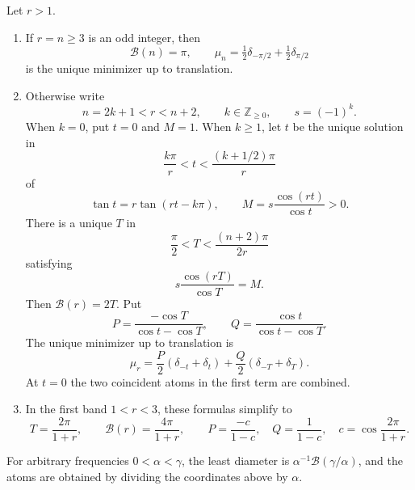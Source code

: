 \begin{theorem}\label{filt:classification}
Let $r>1$.
\begin{enumerate}
\item If $r=n\ge3$ is an odd integer, then
\[
 \mathcal B(n)=\pi,
 \qquad \mu_n=\tfrac12\delta_{-\pi/2}+\tfrac12\delta_{\pi/2}
\]
is the unique minimizer up to translation.
\item Otherwise write
\[
 n=2k+1<r<n+2,\qquad k\in\mathbb Z_{\ge0},\qquad s=(-1)^k.
\]
When $k=0$, put $t=0$ and $M=1$.  When $k\ge1$, let $t$ be the unique
solution in
\[
 \frac{k\pi}{r}<t<\frac{(k+1/2)\pi}{r}
\]
of
\begin{equation}\label{filt:tangent}
 \tan t=r\tan(rt-k\pi),
 \qquad M=s\frac{\cos(rt)}{\cos t}>0.
\end{equation}
There is a unique $T$ in
\[
 \frac\pi2<T<\frac{(n+2)\pi}{2r}
\]
satisfying
\begin{equation}\label{filt:crossing}
 s\frac{\cos(rT)}{\cos T}=M.
\end{equation}
Then $\mathcal B(r)=2T$.  Put
\[
 P=\frac{-\cos T}{\cos t-\cos T},\qquad
 Q=\frac{\cos t}{\cos t-\cos T}.
\]
The unique minimizer up to translation is
\begin{equation}\label{filt:measure}
 \mu_r=\frac P2(\delta_{-t}+\delta_t)
             +\frac Q2(\delta_{-T}+\delta_T).
\end{equation}
At $t=0$ the two coincident atoms in the first term are combined.
\item In the first band $1<r<3$, these formulas simplify to
\begin{equation}\label{filt:firstband}
 T=\frac{2\pi}{1+r},\qquad
 \mathcal B(r)=\frac{4\pi}{1+r},\qquad
 P=\frac{-c}{1-c},\quad Q=\frac1{1-c},\quad
 c=\cos\frac{2\pi}{1+r}.
\end{equation}
\end{enumerate}
For arbitrary frequencies $0<\alpha<\gamma$, the least diameter is
$\alpha^{-1}\mathcal B(\gamma/\alpha)$, and the atoms are obtained by
dividing the coordinates above by $\alpha$.
\end{theorem}

